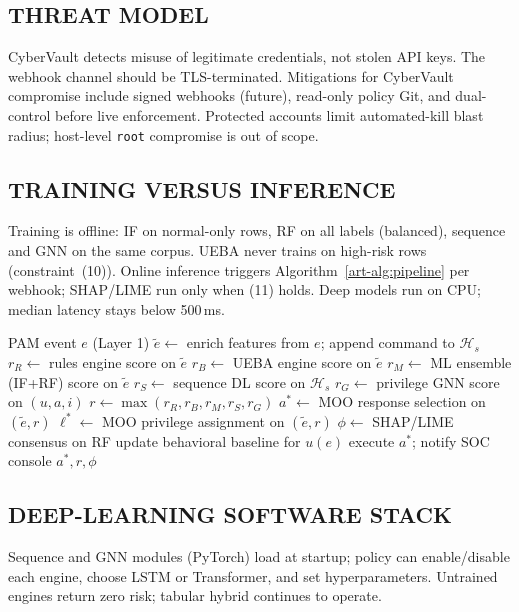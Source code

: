 \subsection{THREAT MODEL}
CyberVault detects misuse of legitimate credentials, not stolen API keys. The webhook channel should be TLS-terminated. Mitigations for CyberVault compromise include signed webhooks (future), read-only policy Git, and dual-control before live enforcement. Protected accounts limit automated-kill blast radius; host-level \texttt{root} compromise is out of scope.

\subsection{TRAINING VERSUS INFERENCE}
Training is offline: IF on normal-only rows, RF on all labels (balanced), sequence and GNN on the same corpus. UEBA never trains on high-risk rows (constraint~(10)). Online inference triggers Algorithm~\ref{art-alg:pipeline} per webhook; SHAP/LIME run only when (11) holds. Deep models run on CPU; median latency stays below 500\,ms.

\begin{algorithm}[H]
\caption{Pseudo-Code of the CyberVault Pipeline}
\label{art-alg:pipeline}
\begin{algorithmic}[1]
\Require PAM event $e$ (Layer 1)
\State $\tilde{e} \leftarrow$ enrich features from $e$; append command to $\mathcal{H}_s$
\State $r_R \leftarrow$ rules engine score on $\tilde{e}$
\State $r_B \leftarrow$ UEBA engine score on $\tilde{e}$
\State $r_M \leftarrow$ ML ensemble (IF+RF) score on $\tilde{e}$
\State $r_S \leftarrow$ sequence DL score on $\mathcal{H}_s$
\State $r_G \leftarrow$ privilege GNN score on $(u,a,i)$
\State $r \leftarrow \max(r_R,r_B,r_M,r_S,r_G)$
\State $a^* \leftarrow$ MOO response selection on $(\tilde{e},r)$
\State $\ell^* \leftarrow$ MOO privilege assignment on $(\tilde{e},r)$
\State $\phi \leftarrow$ SHAP/LIME consensus on RF
\EndIf
{}
\State update behavioral baseline for $u(e)$
\EndIf
\State execute $a^*$; notify SOC console
\State \Return $a^*,r,\phi$
\end{algorithmic}
\end{algorithm}


\subsection{DEEP-LEARNING SOFTWARE STACK}
Sequence and GNN modules (PyTorch) load at startup; policy can enable/disable each engine, choose LSTM or Transformer, and set hyperparameters. Untrained engines return zero risk; tabular hybrid continues to operate.

